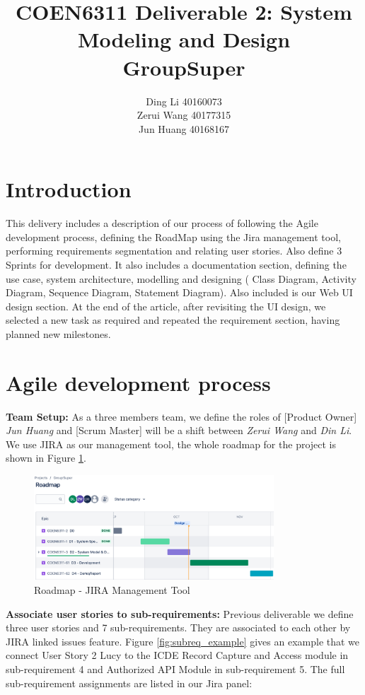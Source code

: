\documentclass[]{article}
\title{COEN6311 Deliverable 2: System Modeling and Design \\ GroupSuper}
\author{Ding Li 40160073 \\ Zerui Wang 40177315 \\ Jun Huang 40168167}
\begin{document}
\maketitle

\linespread{1.2}
\selectfont

\section{Introduction}
This delivery includes a description of our process of following the Agile development process,
defining the RoadMap using the Jira management tool, performing requirements segmentation and relating user stories.
Also define 3 Sprints for development. It also includes a documentation section, defining the use case,
system architecture, modelling and designing ( Class Diagram, Activity Diagram, Sequence Diagram, Statement Diagram).
Also included is our Web UI design section.
At the end of the article, after revisiting the UI design,
we selected a new task as required and repeated the requirement section, having planned new milestones.


\section{Agile development process}

\textbf{Team Setup:} As a three members team, we define the roles of [Product Owner]
\textit{Jun Huang} and [Scrum Master] will be a shift between \textit{Zerui Wang} and \textit{Din Li}.
We use JIRA as our management tool,
the whole roadmap for the project is shown in Figure \ref{fig:roadmap}.

\begin{figure}[htp]
	\centering
	\includegraphics[width=0.8\textwidth]{./img/JiraRoadmap.png}
	\caption{Roadmap - JIRA Management Tool}
	\label{fig:roadmap}
\end{figure}

\textbf{Associate user stories to sub-requirements:}
Previous deliverable we define three user stories and 7 sub-requirements.
They are associated to each other by JIRA linked issues feature.
Figure \ref{fig:subreq_example} gives an example that we connect User Story 2 Lucy
to the ICDE Record Capture and Access module in sub-requirement 4 and Authorized API Module in sub-requirement 5.
The full sub-requirement assignments are listed in our Jira panel:
\end{document}
